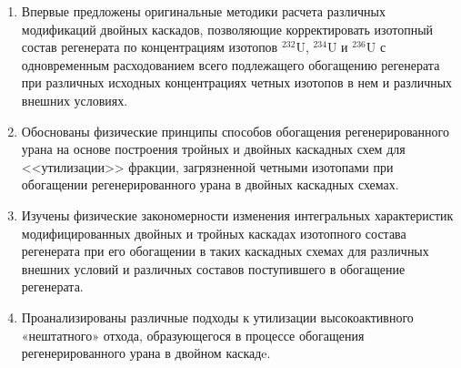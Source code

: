 {\novelty}
\begin{enumerate}
  \item Впервые предложены оригинальные методики расчета различных модификаций двойных каскадов, позволяющие корректировать
  изотопный состав регенерата по концентрациям изотопов $^{232}$U, $^{234}$U и $^{236}$U с одновременным расходованием всего подлежащего обогащению регенерата при различных исходных концентрациях четных изотопов в нем и различных внешних условиях.
  \item Обоснованы физические принципы способов обогащения регенерированного урана на основе построения тройных и двойных каскадных схем для <<утилизации>> фракции, загрязненной четными изотопами при обогащении регенерированного урана в двойных каскадных схемах.
  \item Изучены физические закономерности изменения интегральных характеристик модифицированных двойных и тройных каскадах изотопного состава регенерата при его обогащении в таких каскадных схемах для различных внешних условий и различных составов поступившего в обогащение регенерата.
  \item Проанализированы различные подходы к утилизации высокоактивного «нештатного» отхода, образующегося в процессе обогащения регенерированного урана в двойном каскадe.
\end{enumerate}

